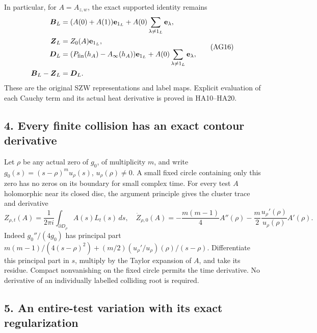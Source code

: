 \documentclass[
  10pt,
  a4paper,
]{article}
\begin{document}
In particular, for \(A=A_{z,w}\), the exact supported identity remains
\[
\begin{split}
\boldsymbol B_L&=(A(0)+A(1))\mathbf e_{1_L}
+A(0)\sum_{\lambda\ne1_L}\mathbf e_\lambda,\\
\boldsymbol Z_L&=Z_0(A)\mathbf e_{1_L},\\
\boldsymbol D_L&=(P_{\rm fin}(h_A)-A_\infty(h_A))\mathbf e_{1_L}
+A(0)\sum_{\lambda\ne1_L}\mathbf e_\lambda,\\
\boldsymbol B_L-\boldsymbol Z_L&=\boldsymbol D_L.
\end{split}\tag{AG16}
\] These are the original SZW representations and label maps. Explicit
evaluation of each Cauchy term and its actual heat derivative is proved
in HA10--HA20.

\subsection{4. Every finite collision has an exact contour
derivative}\label{every-finite-collision-has-an-exact-contour-derivative}

Let \(\rho\) be any actual zero of \(g_0\), of multiplicity \(m\), and
write \(g_0(s)=(s-\rho)^mu_\rho(s)\), \(u_\rho(\rho)\ne0\). A small
fixed circle containing only this zero has no zeros on its boundary for
small complex time. For every test \(A\) holomorphic near its closed
disc, the argument principle gives the cluster trace and derivative \[
Z_{\rho,t}(A)=\frac1{2\pi i}\int_{\partial D_\rho}A(s)L_t(s)\,ds,
\quad
\dot Z_{\rho,0}(A)
=-\frac{m(m-1)}4A''(\rho)
-\frac m2\frac{u_\rho'(\rho)}{u_\rho(\rho)}A'(\rho).
\tag{AG17}
\] Indeed \(g_0''/(4g_0)\) has principal part
\(m(m-1)/(4(s-\rho)^2)+(m/2)(u_\rho'/u_\rho)(\rho)/(s-\rho)\).
Differentiate this principal part in \(s\), multiply by the Taylor
expansion of \(A\), and take its residue. Compact nonvanishing on the
fixed circle permits the time derivative. No derivative of an
individually labelled colliding root is required.

\subsection{5. An entire-test variation with its exact
regularization}\label{an-entire-test-variation-with-its-exact-regularization}
\end{document}
